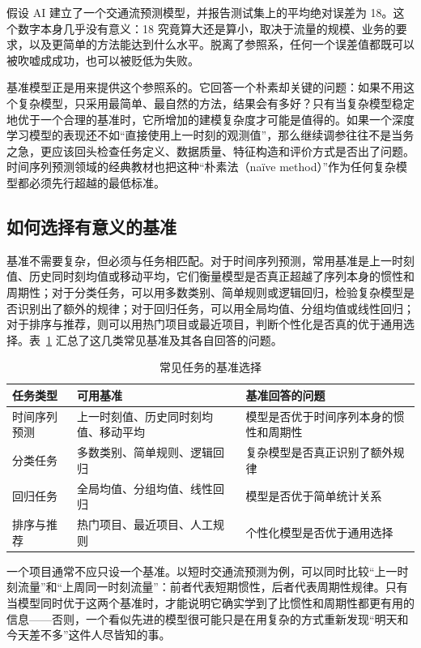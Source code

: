 假设 AI 建立了一个交通流预测模型，并报告测试集上的平均绝对误差为 18。这个数字本身几乎没有意义：18 究竟算大还是算小，取决于流量的规模、业务的要求，以及更简单的方法能达到什么水平。脱离了参照系，任何一个误差值都既可以被吹嘘成成功，也可以被贬低为失败。

基准模型正是用来提供这个参照系的。它回答一个朴素却关键的问题：如果不用这个复杂模型，只采用最简单、最自然的方法，结果会有多好？只有当复杂模型稳定地优于一个合理的基准时，它所增加的建模复杂度才可能是值得的。如果一个深度学习模型的表现还不如“直接使用上一时刻的观测值”，那么继续调参往往不是当务之急，更应该回头检查任务定义、数据质量、特征构造和评价方式是否出了问题。时间序列预测领域的经典教材也把这种“朴素法（naïve method）”作为任何复杂模型都必须先行超越的最低标准\cite{hyndman2021forecasting}。

\subsection{如何选择有意义的基准}

基准不需要复杂，但必须与任务相匹配。对于时间序列预测，常用基准是上一时刻值、历史同时刻均值或移动平均，它们衡量模型是否真正超越了序列本身的惯性和周期性；对于分类任务，可以用多数类别、简单规则或逻辑回归，检验复杂模型是否识别出了额外的规律；对于回归任务，可以用全局均值、分组均值或线性回归；对于排序与推荐，则可以用热门项目或最近项目，判断个性化是否真的优于通用选择。表~\ref{tab:baselines} 汇总了这几类常见基准及其各自回答的问题。

\begin{table}[htbp]
\centering
\caption{常见任务的基准选择}
\label{tab:baselines}
\small
\begin{tabular}{p{}p{}p{}}
\toprule
任务类型 & 可用基准 & 基准回答的问题 \\
\midrule
时间序列预测 & 上一时刻值、历史同时刻均值、移动平均 & 模型是否优于时间序列本身的惯性和周期性 \\
分类任务 & 多数类别、简单规则、逻辑回归 & 复杂模型是否真正识别了额外规律 \\
回归任务 & 全局均值、分组均值、线性回归 & 模型是否优于简单统计关系 \\
排序与推荐 & 热门项目、最近项目、人工规则 & 个性化模型是否优于通用选择 \\
\bottomrule
\end{tabular}
\end{table}

一个项目通常不应只设一个基准。以短时交通流预测为例，可以同时比较“上一时刻流量”和“上周同一时刻流量”：前者代表短期惯性，后者代表周期性规律。只有当模型同时优于这两个基准时，才能说明它确实学到了比惯性和周期性都更有用的信息——否则，一个看似先进的模型很可能只是在用复杂的方式重新发现“明天和今天差不多”这件人尽皆知的事。

